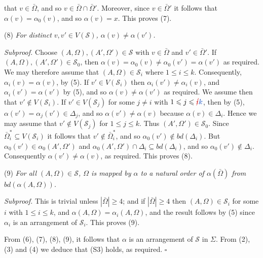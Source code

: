 \noindent that $v \in \bar{\Omega}$, and so $v \in \bar{\Omega} \cap \bar{\Omega}'$. Moreover, since $v \in \bar{\Omega}'$ it follows that $\alpha(v) = \alpha_0(v)$, and so $\alpha(v) = x$. This proves (7).

\hspace*{12pt}(8) \textit{For distinct $v, v' \in V(\mathscr{S})$, $\alpha(v) \neq \alpha(v')$.}

\textit{Subproof.} Choose $(A, \Omega), (A', \Omega') \in \mathscr{S}$ with $v \in \bar{\Omega}$ and $v' \in \bar{\Omega}'$. If $(A, \Omega), (A', \Omega') \in \mathscr{S}_0$, then $\alpha(v) = \alpha_0(v) \neq \alpha_0(v') = \alpha(v')$ as required. We may therefore assume that $(A, \Omega) \in \mathscr{S}_i$ where $1 \le i \le k$. Consequently, $\alpha_i(v) = \alpha(v)$, by (5). If $v' \in V(\mathscr{S}_i)$ then $\alpha_i(v') \neq \alpha_i(v)$, and $\alpha_i(v') = \alpha(v')$ by (5), and so $\alpha(v) \neq \alpha(v')$ as required. We assume then that $v' \notin V(\mathscr{S}_i)$. If $v' \in V(\mathscr{S}_j)$ for some $j \neq i$ with $1 \le j \le \delm{i}\fix{k}$, then by (5), $\alpha(v') = \alpha_j(v') \in \Delta_j$, and so $\alpha(v') \neq \alpha(v)$ because $\alpha(v) \in \Delta_i$. Hence we may assume that $v' \notin V(\mathscr{S}_j)$ for $1 \le j \le k$. Thus $(A', \Omega') \in \mathscr{S}_0$. Since $\bar{\Omega}_i^* \subseteq V(\mathscr{S}_i)$ it follows that $v' \notin \bar{\Omega}_i^*$, and so $\alpha_0(v') \notin bd(\Delta_i)$. But $\alpha_0(v') \in \alpha_0(A', \Omega')$ and $\alpha_0(A', \Omega') \cap \Delta_i \subseteq bd(\Delta_i)$, and so $\alpha_0(v') \notin \Delta_i$. Consequently $\alpha(v') \neq \alpha(v)$, as required. This proves (8).

\hspace*{12pt}(9) \textit{For all $(A, \Omega) \in \mathscr{S}$, $\Omega$ is mapped by $\alpha$ to a natural order of $\alpha(\bar{\Omega})$ from $bd(\alpha(A, \Omega))$.}

\textit{Subproof.} This is trivial unless $|\bar{\Omega}| \ge 4$; and if $|\bar{\Omega}| \ge 4$ then $(A, \Omega) \in \mathscr{S}_i$ for some $i$ with $1 \le i \le k$, and $\alpha(A, \Omega) = \alpha_i(A, \Omega)$, and the result follows by (5) since $\alpha_i$ is an arrangement of $\mathscr{S}_i$. This proves (9).

From (6), (7), (8), (9), it follows that $\alpha$ is an arrangement of $\mathscr{S}$ in $\Sigma$. From (2), (3) and (4) we deduce that (S3) holds, as required. $\square$


